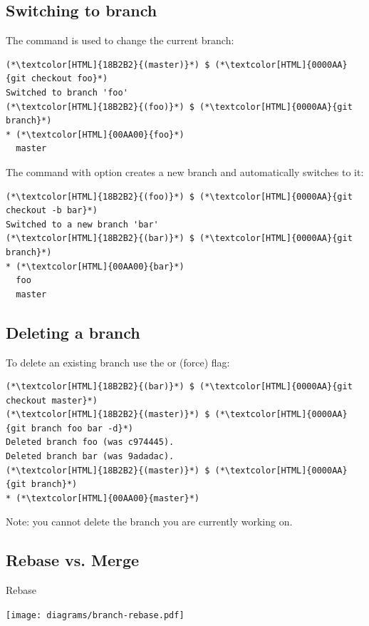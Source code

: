 \subsection{Switching to branch}
\begin{frame}[fragile]
  \subslidetitle
  The  command is used to change the current branch:
  \begin{lstlisting}
(*\textcolor[HTML]{18B2B2}{(master)}*) $ (*\textcolor[HTML]{0000AA}{git checkout foo}*)
Switched to branch 'foo'
(*\textcolor[HTML]{18B2B2}{(foo)}*) $ (*\textcolor[HTML]{0000AA}{git branch}*)
* (*\textcolor[HTML]{00AA00}{foo}*)
  master
\end{lstlisting}

  The  command with  option creates a new branch and automatically switches to it:
  \begin{lstlisting}
(*\textcolor[HTML]{18B2B2}{(foo)}*) $ (*\textcolor[HTML]{0000AA}{git checkout -b bar}*)
Switched to a new branch 'bar'
(*\textcolor[HTML]{18B2B2}{(bar)}*) $ (*\textcolor[HTML]{0000AA}{git branch}*)
* (*\textcolor[HTML]{00AA00}{bar}*)
  foo
  master
\end{lstlisting}
\end{frame}

\subsection{Deleting a branch}
\begin{frame}[fragile]
  \subslidetitle
  To delete an existing branch use the  or  (force) flag:
\begin{lstlisting}
(*\textcolor[HTML]{18B2B2}{(bar)}*) $ (*\textcolor[HTML]{0000AA}{git checkout master}*)
(*\textcolor[HTML]{18B2B2}{(master)}*) $ (*\textcolor[HTML]{0000AA}{git branch foo bar -d}*)
Deleted branch foo (was c974445).
Deleted branch bar (was 9adadac).
(*\textcolor[HTML]{18B2B2}{(master)}*) $ (*\textcolor[HTML]{0000AA}{git branch}*)
* (*\textcolor[HTML]{00AA00}{master}*)
\end{lstlisting}

  Note: you cannot delete the branch you are currently working on.
\end{frame}

\subsection{Rebase vs. Merge}
\begin{frame}[fragile]
  \subslidetitle
  Rebase
  \centerline{\texttt{[image: diagrams/branch-rebase.pdf]}}
\end{frame}

